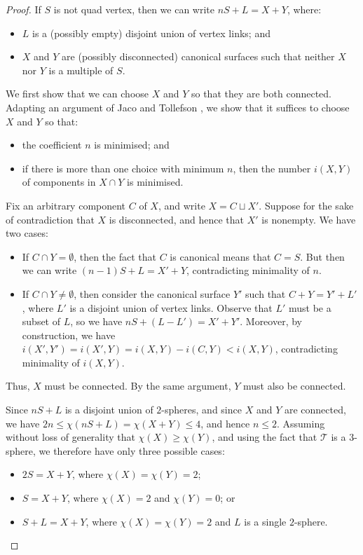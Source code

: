\documentclass[10pt,a4paper]{amsart}
\newcommand{\tri}{\mathcal{T}}
\begin{document}
\begin{proof}
If $S$ is not quad vertex, then we can write $nS+L = X+Y$, where:
\begin{itemize}
\item
$L$ is a (possibly empty) disjoint union of vertex links; and
\item
$X$ and $Y$ are (possibly disconnected) canonical surfaces such that neither $X$ nor $Y$ is a multiple of $S$.
\end{itemize}
We first show that we can choose $X$ and $Y$ so that they are both connected.
Adapting an argument of Jaco and Tollefson \cite{jaco1995algorithms}, we show that it suffices to choose $X$ and $Y$ so that:
\begin{itemize}
\item
the coefficient $n$ is minimised; and
\item
if there is more than one choice with minimum $n$, then the number $i(X,Y)$ of components in $X\cap Y$ is minimised.
\end{itemize}

Fix an arbitrary component $C$ of $X$, and write $X = C \sqcup X'$.
Suppose for the sake of contradiction that $X$ is disconnected, and hence that $X'$ is nonempty.
We have two cases:
\begin{itemize}
\item
If $C \cap Y = \emptyset$, then the fact that $C$ is canonical means that $C = S$.
But then we can write $(n-1)S + L = X' + Y$, contradicting minimality of $n$.
\item
If $C \cap Y \neq \emptyset$, then consider the canonical surface $Y'$ such that $C + Y = Y' + L'$, where $L'$ is a disjoint union of vertex links.
Observe that $L'$ must be a subset of $L$, so we have $nS + (L - L') = X' + Y'$.
Moreover, by construction, we have $i(X',Y') = i(X',Y) = i(X,Y) - i(C,Y) < i(X,Y)$, contradicting minimality of $i(X,Y)$.
\end{itemize}
Thus, $X$ must be connected.
By the same argument, $Y$ must also be connected.

Since $nS+L$ is a disjoint union of $2$-spheres, and since $X$ and $Y$ are connected, we have $2n \leqslant \chi(nS+L) = \chi(X+Y) \leqslant 4$, and hence $n \leqslant 2$.
Assuming without loss of generality that $\chi(X) \geqslant \chi(Y)$, and using the fact that $\tri$ is a $3$-sphere, we therefore have only three possible cases:
\begin{itemize}
\item
$2S=X+Y$, where $\chi(X)=\chi(Y)=2$;
\item
$S=X+Y$, where $\chi(X)=2$ and $\chi(Y)=0$; or
\item
$S+L=X+Y$, where $\chi(X)=\chi(Y)=2$ and $L$ is a single $2$-sphere.
\qedhere
\end{itemize}
\end{proof}
\end{document}
